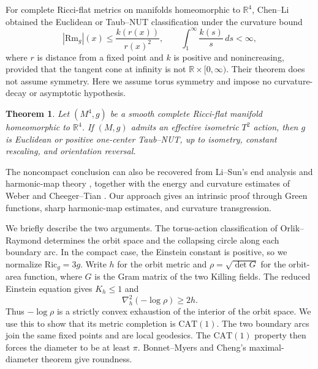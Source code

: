 \documentclass[letterpaper]{amsart}
\newtheorem{thm}{Theorem}[section]
\theoremstyle{definition}
\theoremstyle{remark}
\begin{document}
For complete Ricci-flat metrics on manifolds homeomorphic to
$\mathbb R^4$, Chen--Li \cite[Theorem~1.6]{notes-ChenLi} obtained the
Euclidean or Taub--NUT classification under the curvature bound
\[
 |\mathrm{Rm}_g|(x)\leq\frac{k(r(x))}{r(x)^2},
 \qquad
 \int_1^\infty\frac{k(s)}{s}\,ds<\infty,
\]
where $r$ is distance from a fixed point and $k$ is positive and
nonincreasing, provided that the tangent cone at infinity is not
$\mathbb R\times[0,\infty)$. Their theorem does not assume symmetry.
Here we assume torus symmetry and impose no curvature-decay or
asymptotic hypothesis.

\begin{thm}\label{notes-R4-classification}
Let $(M^4,g)$ be a smooth complete Ricci-flat manifold homeomorphic to
$\mathbb R^4$. If $(M,g)$ admits an effective isometric $T^2$ action, then
$g$ is Euclidean or positive one-center Taub--NUT, up to isometry,
constant rescaling, and orientation reversal.
\end{thm}

The noncompact conclusion can also be recovered from Li--Sun's end
analysis and harmonic-map theory \cite{notes-LiSunCompact,notes-LiSunHarmonic},
together with the energy and curvature estimates of Weber
\cite{notes-Weber} and Cheeger--Tian \cite{notes-CheegerTian}.
Our approach gives an intrinsic proof through Green functions, sharp
harmonic-map estimates, and curvature transgression.

We briefly describe the two arguments. The torus-action classification
of Orlik--Raymond \cite{notes-OrlikRaymond} determines the orbit space
and the collapsing circle along each boundary arc. In the compact case,
the Einstein constant is positive, so we normalize
$\mathrm{Ric}_g=3g$. Write $h$ for the orbit metric and
$\rho=\sqrt{\det G}$ for the orbit-area function, where $G$ is the Gram
matrix of the two Killing fields. The reduced Einstein equation gives
$K_h\leq1$ and
\[
 \nabla_h^2(-\log\rho)\geq2h.
\]
Thus $-\log\rho$ is a strictly convex exhaustion of the interior of the
orbit space. We use this to show that its metric completion is
$\mathrm{CAT}(1)$. The two boundary arcs join the same fixed points and
are local geodesics. The $\mathrm{CAT}(1)$ property then forces the
diameter to be at least $\pi$. Bonnet--Myers and Cheng's maximal-diameter
theorem \cite{notes-Cheng} give roundness.
\end{document}
